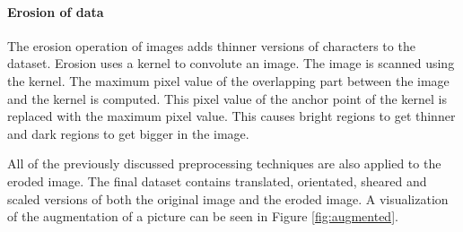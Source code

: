 \documentclass{article}
\begin{document}
\paragraph{Erosion of data}
The erosion operation of images adds thinner versions of characters to the dataset. Erosion uses a kernel to convolute an image.
The image is scanned using the kernel. The maximum pixel value of the overlapping part between the image and the kernel is computed. This pixel value of the anchor point of the kernel is replaced with the maximum pixel value.
This causes bright regions to get thinner and dark regions to get bigger in the image.

All of the previously discussed preprocessing techniques are also applied to the eroded image. The final dataset contains translated, orientated, sheared and scaled versions of both the original image and the eroded image. A visualization of the augmentation of a picture can be seen in Figure \ref{fig:augmented}.
\end{document}
